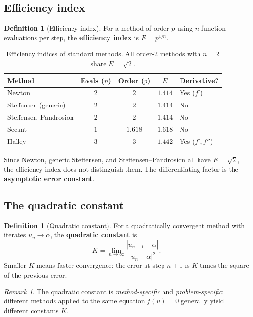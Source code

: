 \documentclass[10pt,a4paper,oneside]{book}
\theoremstyle{definition}
\newtheorem{definition}[theorem]{Definition}
\theoremstyle{remark}
\newtheorem{remark}[theorem]{Remark}
\begin{document}
\subsection{Efficiency index}

\begin{definition}[Efficiency index]
For a method of order $p$ using $n$ function evaluations per step, the \textbf{efficiency index} is $E = p^{1/n}$.
\end{definition}

\begin{table}[h]
\centering
\begin{tabular}{lcccl}
\toprule
\textbf{Method} & \textbf{Evals ($n$)} & \textbf{Order ($p$)} & \textbf{$E$} & \textbf{Derivative?} \\
\midrule
Newton & $2$ & $2$ & $1.414$ & Yes ($f'$) \\
Steffensen (generic) & $2$ & $2$ & $1.414$ & No \\
Steffensen--Pandrosion & $2$ & $2$ & $1.414$ & No \\
Secant & $1$ & $1.618$ & $1.618$ & No \\
Halley & $3$ & $3$ & $1.442$ & Yes ($f', f''$) \\
\bottomrule
\end{tabular}
\caption{Efficiency indices of standard methods.  All order-2 methods with $n=2$ share $E = \sqrt{2}$.}
\label{tab:efficiency}
\end{table}

Since Newton, generic Steffensen, and Steffensen--Pandrosion all have $E = \sqrt{2}$, the efficiency index does not distinguish them.  The differentiating factor is the \textbf{asymptotic error constant}.

\subsection{The quadratic constant}

\begin{definition}[Quadratic constant]
\label{def:quadratic_constant}
For a quadratically convergent method with iterates $u_n \to \alpha$, the \textbf{quadratic constant} is
\[
  K = \lim_{n \to \infty} \frac{|u_{n+1} - \alpha|}{|u_n - \alpha|^2}.
\]
Smaller $K$ means faster convergence: the error at step $n+1$ is $K$ times the square of the previous error.
\end{definition}

\begin{remark}
The quadratic constant is \emph{method-specific} and \emph{problem-specific}: different methods applied to the same equation $f(u) = 0$ generally yield different constants $K$.
\end{remark}
\end{document}
